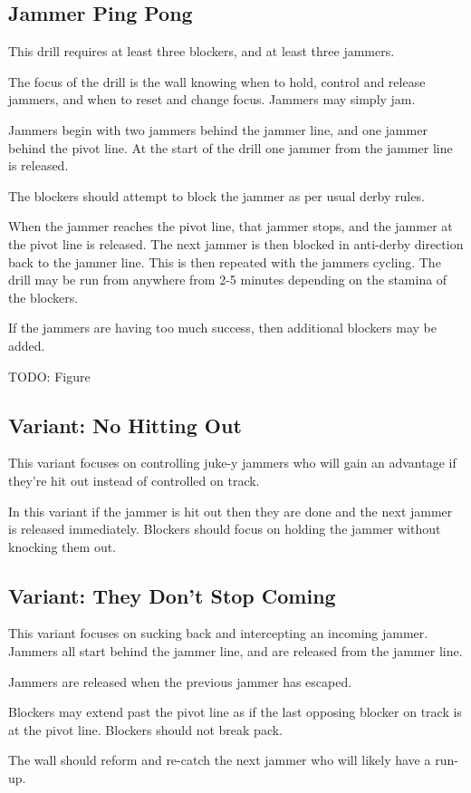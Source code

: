 \subsection{Jammer Ping Pong}
\label{sec:three_wall:reforming/ping_pong}

This drill requires at least three blockers, and at least three jammers.

The focus of the drill is the wall knowing when to hold, control and release jammers, and when to reset and change focus. 
Jammers may simply jam.


Jammers begin with two jammers behind the jammer line, and one jammer behind the pivot line.
At the start of the drill one jammer from the jammer line is released.

The blockers should attempt to block the jammer as per usual derby rules.

When the jammer reaches the pivot line, that jammer stops, and the jammer at the pivot line is released. 
The next jammer is then blocked in anti-derby direction back to the jammer line.
This is then repeated with the jammers cycling. 
The drill may be run from anywhere from 2-5 minutes depending on the stamina of the blockers. 

If the jammers are having too much success, then additional blockers may be added.


{\color{red} TODO: Figure}

\subsection*{Variant: No Hitting Out}  
\label{sec:three_wall/ping_pong/no_hitting_out}

This variant focuses on controlling juke-y jammers who will gain an advantage if they're hit out instead of controlled on track.  

In this variant if the jammer is hit out then they are done and the next jammer is released immediately.
Blockers should focus on holding the jammer without knocking them out. 


\subsection*{Variant: They Don't Stop Coming} 
\label{sec:three_wall/ping_pong/dont_stop}

This variant focuses on sucking back and intercepting an incoming jammer.
Jammers all start behind the jammer line, and are released from the jammer line. 

Jammers are released when the previous jammer has escaped.

Blockers may extend past the pivot line as if the last opposing blocker on track is at the pivot line. Blockers should not break pack. 

The wall should reform and re-catch the next jammer who will likely have a run-up.  
